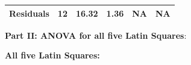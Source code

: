 \documentclass[]{article}
\begin{document}
\begin{longtable}[]{@{}cccccc@{}}
\begin{minipage}[t]{0.19\columnwidth}
\textbf{Residuals}\strut
\end{minipage} & \begin{minipage}[t]{0.06\columnwidth}\centering\strut
12\strut
\end{minipage} & \begin{minipage}[t]{0.10\columnwidth}\centering\strut
16.32\strut
\end{minipage} & \begin{minipage}[t]{0.12\columnwidth}\centering\strut
1.36\strut
\end{minipage} & \begin{minipage}[t]{0.12\columnwidth}\centering\strut
NA\strut
\end{minipage} & \begin{minipage}[t]{0.12\columnwidth}\centering\strut
NA\strut
\end{minipage}\tabularnewline
\bottomrule
\end{longtable}

\textbf{Part II: ANOVA for all five Latin Squares}:

\textbf{All five Latin Squares:}
\end{document}
